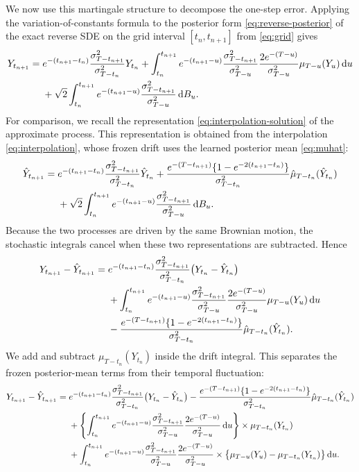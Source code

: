 \documentclass[11pt]{article}
\theoremstyle{definition}
\newcommand{\dd}{\,\mathrm{d}}
\begin{document}
We now use this martingale structure to decompose the one-step error.
Applying the variation-of-constants formula to the posterior form
\eqref{eq:reverse-posterior} of the exact reverse SDE on the grid
interval $[t_n,t_{n+1}]$ from \eqref{eq:grid} gives
\begin{align}
Y_{t_{n+1}}
={}&e^{-(t_{n+1}-t_n)}
\frac{\sigma_{T-t_{n+1}}^2}{\sigma_{T-t_n}^2}Y_{t_n}
+\int_{t_n}^{t_{n+1}}
 e^{-(t_{n+1}-u)}
 \frac{\sigma_{T-t_{n+1}}^2}{\sigma_{T-u}^2}
 \frac{2e^{-(T-u)}}{\sigma_{T-u}^2}\mu_{T-u}(Y_u)\dd u\notag\\
&+\sqrt{2}\int_{t_n}^{t_{n+1}}
 e^{-(t_{n+1}-u)}
 \frac{\sigma_{T-t_{n+1}}^2}{\sigma_{T-u}^2}\dd B_u.
\label{eq:exact-mild}
\end{align}
For comparison, we recall the representation
\eqref{eq:interpolation-solution} of the approximate process. This
representation is obtained from the interpolation
\eqref{eq:interpolation}, whose frozen drift uses the learned
posterior mean \eqref{eq:muhat}:
\begin{align}
\hat Y_{t_{n+1}}
={}&e^{-(t_{n+1}-t_n)}
\frac{\sigma_{T-t_{n+1}}^2}{\sigma_{T-t_n}^2}
\hat Y_{t_n}
+\frac{
    e^{-(T-t_{n+1})}\{1-e^{-2(t_{n+1}-t_n)}\}
}{
    \sigma_{T-t_n}^2
}
\hat\mu_{T-t_n}(\hat Y_{t_n})\notag\\
&+\sqrt{2}\int_{t_n}^{t_{n+1}}
 e^{-(t_{n+1}-u)}
 \frac{\sigma_{T-t_{n+1}}^2}{\sigma_{T-u}^2}\dd B_u.
\label{eq:interpolation-solution}
\end{align}
Because the two processes are driven by the same Brownian motion,
the stochastic integrals cancel when these two representations are
subtracted. Hence
\begin{align}
Y_{t_{n+1}}-\hat Y_{t_{n+1}}
={}&e^{-(t_{n+1}-t_n)}
\frac{\sigma_{T-t_{n+1}}^2}{\sigma_{T-t_n}^2}
\bigl(Y_{t_n}-\hat Y_{t_n}\bigr)\notag\\
&+\int_{t_n}^{t_{n+1}}
 e^{-(t_{n+1}-u)}
 \frac{\sigma_{T-t_{n+1}}^2}{\sigma_{T-u}^2}
 \frac{2e^{-(T-u)}}{\sigma_{T-u}^2}
 \mu_{T-u}(Y_u)\dd u\notag\\
&-\frac{
    e^{-(T-t_{n+1})}\{1-e^{-2(t_{n+1}-t_n)}\}
}{
    \sigma_{T-t_n}^2
}
\hat\mu_{T-t_n}(\hat Y_{t_n}).\notag
\end{align}
We add and subtract $\mu_{T-t_n}(Y_{t_n})$ inside the drift
integral. This separates the frozen posterior-mean terms from their
temporal fluctuation:
\begin{align}
Y_{t_{n+1}}-\hat Y_{t_{n+1}}
={}&e^{-(t_{n+1}-t_n)}
\frac{\sigma_{T-t_{n+1}}^2}{\sigma_{T-t_n}^2}
\bigl(Y_{t_n}-\hat Y_{t_n}\bigr)
-\frac{
    e^{-(T-t_{n+1})}\{1-e^{-2(t_{n+1}-t_n)}\}
}{
    \sigma_{T-t_n}^2
}
\hat\mu_{T-t_n}(\hat Y_{t_n})\notag\\
&+\left\{
\int_{t_n}^{t_{n+1}}
 e^{-(t_{n+1}-u)}
 \frac{\sigma_{T-t_{n+1}}^2}{\sigma_{T-u}^2}
 \frac{2e^{-(T-u)}}{\sigma_{T-u}^2}\dd u
\right\}
\times
\mu_{T-t_n}(Y_{t_n})\notag\\
&+\int_{t_n}^{t_{n+1}}
 e^{-(t_{n+1}-u)}
 \frac{\sigma_{T-t_{n+1}}^2}{\sigma_{T-u}^2}
 \frac{2e^{-(T-u)}}{\sigma_{T-u}^2}
\times
\bigl\{
    \mu_{T-u}(Y_u)-\mu_{T-t_n}(Y_{t_n})
\bigr\}\dd u.\notag
\end{align}
\end{document}
